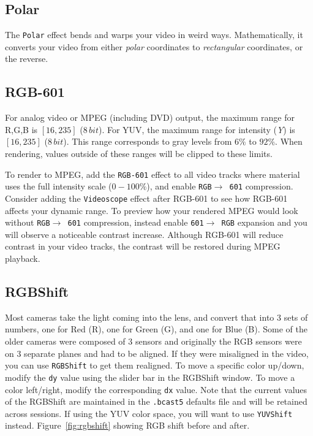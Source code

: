 \subsection{Polar}%
\label{sub:polar}

The \texttt{Polar} effect bends and warps your video in weird ways. Mathematically, it converts your video from either \textit{polar} coordinates to \textit{rectangular} coordinates, or the reverse.

\subsection{RGB-601}%
\label{sub:rgb-601}

For analog video or MPEG (including DVD) output, the maximum range for R,G,B is $[16,235]$ ($8\,bit$). For YUV, the maximum range for intensity (\textit{Y}) is $[16, 235]$ ($8\,bit$). This range corresponds to gray levels from $6\%$ to $92\%$. When rendering, values outside of these ranges will be clipped to these limits.

To render to MPEG, add the \texttt{RGB-601} effect to all video tracks where material uses the full intensity scale ($0-100\%$), and enable \texttt{RGB$\rightarrow$ 601} compression. Consider adding the \texttt{Videoscope} effect after RGB-601 to see how RGB-601 affects your dynamic range. To preview how your rendered MPEG would look without \texttt{RGB$\rightarrow$ 601} compression, instead enable \texttt{601$\rightarrow$ RGB} expansion and you will observe a noticeable contrast increase. Although RGB-601 will reduce contrast in your video tracks, the contrast will be restored during MPEG playback.

\subsection{RGBShift}%
\label{sub:rgb-shift}

Most cameras take the light coming into the lens, and convert that into $3$ sets of numbers, one for Red (R), one for Green (G), and one for Blue (B). Some of the older cameras were composed of $3$ sensors and originally the RGB sensors were on $3$ separate planes and had to be aligned. If they were misaligned in the video, you can use \texttt{RGBShift} to get them realigned. To move a specific color up/down, modify the \texttt{dy} value using the slider bar in the RGBShift window. To move a color left/right, modify the corresponding \texttt{dx} value. Note that the current values of the RGBShift are maintained in the \texttt{.bcast5} defaults file and will be retained across sessions. If using the YUV color space, you will want to use \texttt{YUVShift} instead. Figure~\ref{fig:rgbshift} showing RGB shift before and after.

